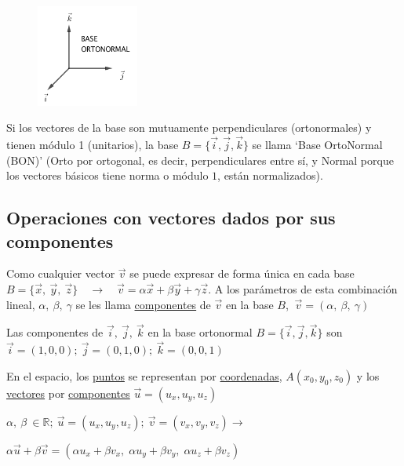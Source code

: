 \vspace{3mm}

\begin{multicols}{2}
	\begin{figure}[H]
	\centering
	\includegraphics[width=0.30\textwidth]{imagenes/imagenes10/T10IM05.png}
	\end{figure}
	Si los vectores de la base son mutuamente perpendiculares (ortonormales) y tienen módulo 1 (unitarios), la base $B=\{\vec i, \vec j, \vec k \}$ se llama `Base OrtoNormal (BON)' 
	\footnotesize{(Orto por ortogonal, es decir, perpendiculares entre sí, y Normal porque los vectores básicos tiene norma o módulo $1$, están normalizados)}\normalsize{.}
\end{multicols}

\subsection{Operaciones con vectores dados por sus componentes}

Como cualquier vector $\vec v$  se puede expresar de forma única en cada base $B=\{\vec x,\ \vec y, \ \vec z\} \quad \to \quad \vec v= \alpha \vec x+ \beta \vec y+ \gamma \vec z$. A los parámetros de esta combinación lineal, $\alpha, \ \beta, \ \gamma$ se les llama \underline{componentes} de $\vec v$ en la base $B$, $\ \vec v=(\alpha, \ \beta, \ \gamma)$
		
Las componentes de $\vec i, \ \vec j, \ \vec k$ en la base ortonormal $B=\{ \vec i, \vec j, \vec k \} $ son $\vec i=(1,0,0); \ \vec j=(0,1,0); \ \vec k=(0,0,1)$
		
 En el espacio, los \underline{puntos} se representan por \underline{coordenadas}, $A(x_0, y_0, z_0)$ y los \underline{vectores} por \underline{componentes} $\vec u=(u_x, u_y, u_z)$


		
\vspace{3mm} $ \alpha , \ \beta \ \in \mathbb{R}; \ \vec u=(u_x,u_y,u_z); \ \vec v = (v_x ,v_y ,v_z) \to $
		
\vspace{2mm}\hspace{20mm}$\alpha \vec u+\beta \vec v=
			(\alpha  u_x+\beta  v_x,\;  \alpha  u_y+\beta  v_y,\;  \alpha  u_z+\beta  v_z) $
			

